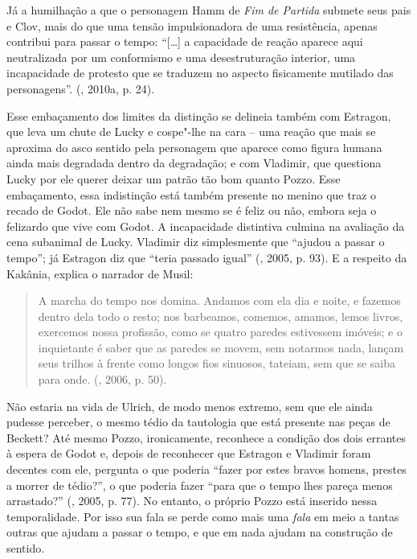 {Já a humilhação a que o personagem Hamm de \emph{Fim de Partida} submete
seus pais e Clov, mais do que uma tensão impulsionadora de uma
resistência, apenas contribui para passar o tempo: ``[\ldots{}] a
capacidade de reação aparece aqui neutralizada por um conformismo e uma
desestruturação interior, uma incapacidade de protesto que se traduzem
no aspecto fisicamente mutilado das personagens''. (, 2010a, p.
24).

Esse embaçamento dos limites da distinção se delineia também com
Estragon, que leva um chute de Lucky e cospe"-lhe na cara -- uma reação
que mais se aproxima do asco sentido pela personagem que aparece como
figura humana ainda mais degradada dentro da degradação; e com Vladimir,
que questiona Lucky por ele querer deixar um patrão tão bom quanto
Pozzo. Esse embaçamento, essa indistinção está também presente no menino
que traz o recado de Godot. Ele não sabe nem mesmo se é feliz ou não,
embora seja o felizardo que vive com Godot. A incapacidade distintiva
culmina na avaliação da cena subanimal de Lucky. Vladimir diz
simplesmente que ``ajudou a passar o tempo''; já Estragon diz que
``teria passado igual'' (, 2005, p. 93). E a respeito da Kakânia,
explica o narrador de Musil:

\begin{quote}
A marcha do tempo nos domina. Andamos com ela dia e noite, e fazemos
dentro dela todo o resto; nos barbeamos, comemos, amamos, lemos livros,
exercemos nossa profissão, como se quatro paredes estivessem imóveis; e
o inquietante é saber que as paredes se movem, sem notarmos nada, lançam
seus trilhos à frente como longos fios sinuosos, tateiam, sem que se
saiba para onde. (, 2006, p. 50).
\end{quote}

Não estaria na vida de Ulrich, de modo menos extremo, sem que ele ainda
pudesse perceber, o mesmo tédio da tautologia que está presente nas
peças de Beckett? Até mesmo Pozzo, ironicamente, reconhece a condição
dos dois errantes à espera de Godot e, depois de reconhecer que Estragon
e Vladimir foram decentes com ele, pergunta o que poderia ``fazer por
estes bravos homens, prestes a morrer de tédio?'', o que poderia fazer
``para que o tempo lhes pareça menos arrastado?'' (, 2005, p.
77). No entanto, o próprio Pozzo está inserido nessa temporalidade. Por
isso sua fala se perde como mais uma \emph{fala} em meio a tantas outras
que ajudam a passar o tempo, e que em nada ajudam na construção de
sentido.

}
